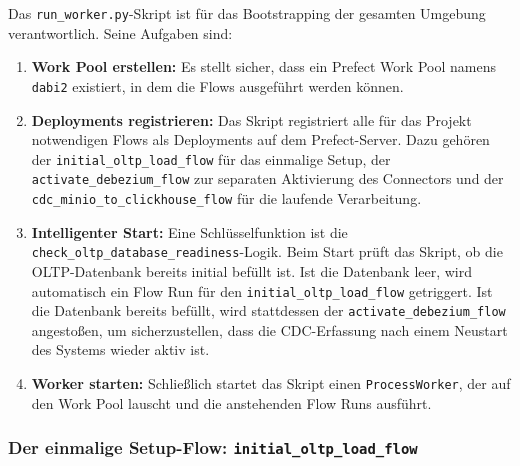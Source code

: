 \documentclass[
    12pt,               
    a4paper,        
    ngerman            
]{scrartcl}
\begin{document}
Das \texttt{run\_worker.py}-Skript ist für das Bootstrapping der gesamten Umgebung verantwortlich. Seine Aufgaben sind:
\begin{enumerate}
    \item \textbf{Work Pool erstellen:} Es stellt sicher, dass ein Prefect Work Pool namens \texttt{dabi2} existiert, in dem die Flows ausgeführt werden können.
    
    \item \textbf{Deployments registrieren:} Das Skript registriert alle für das Projekt notwendigen Flows als Deployments auf dem Prefect-Server. Dazu gehören der \texttt{initial\_oltp\_load\_flow} für das einmalige Setup, der \texttt{activate\_debezium\_flow} zur separaten Aktivierung des Connectors und der \texttt{cdc\_minio\_to\_clickhouse\_flow} für die laufende Verarbeitung.
    
    \item \textbf{Intelligenter Start:} Eine Schlüsselfunktion ist die \texttt{check\_oltp\_database\_readiness}-Logik. Beim Start prüft das Skript, ob die OLTP-Datenbank bereits initial befüllt ist. Ist die Datenbank leer, wird automatisch ein Flow Run für den \texttt{initial\_oltp\_load\_flow} getriggert. Ist die Datenbank bereits befüllt, wird stattdessen der \texttt{activate\_debezium\_flow} angestoßen, um sicherzustellen, dass die CDC-Erfassung nach einem Neustart des Systems wieder aktiv ist.
    
    \item \textbf{Worker starten:} Schließlich startet das Skript einen \texttt{ProcessWorker}, der auf den Work Pool lauscht und die anstehenden Flow Runs ausführt.
\end{enumerate}

\subsubsection{Der einmalige Setup-Flow: \texttt{initial\_oltp\_load\_flow}}
\label{subsec:prefect_setup_flow}
\end{document}
